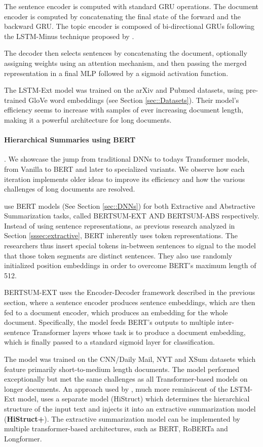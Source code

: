 \documentclass[preprint,review,12pt]{elsarticle}
\begin{document}
The sentence encoder is computed with standard GRU operations. The document encoder is computed by concatenating the final state of the forward and the backward GRU. The topic encoder is composed of bi-directional GRUs following the LSTM-Minus technique proposed by \citet{wang}.

The decoder then selects sentences by concatenating the document, optionally assigning weights using an attention mechanism, and then passing the merged representation in a final MLP followed by a sigmoid activation function. 

The LSTM-Ext model was trained on the arXiv and Pubmed datasets, using pre-trained GloVe \cite{glove} word embeddings (see Section \ref{sec::Datasets}). Their model's efficiency seems to increase with samples of ever increasing document length, making it a powerful architecture for long documents. 


\paragraph{Hierarchical Summaries using BERT}. We showcase the jump from traditional DNNs to todays Transformer models, from Vanilla to BERT and later to specialized variants. We observe how each iteration implements older ideas to improve its efficiency and how the various challenges of long documents are resolved.\label{sssec: HierBERT}

\citet{lapata_bert} use BERT models\cite{toutanova} (See Section \ref{sec::DNNs}) for both Extractive and Abstractive Summarization tasks, called BERTSUM-EXT AND BERTSUM-ABS respectively. Instead of using sentence representations, as previous research analyzed in Section \ref{sssec:extractive}, BERT inherently uses token representations. The researchers thus insert special tokens in-between sentences to signal to the model that those token segments are distinct sentences. They also use randomly initialized position embeddings in order to overcome BERT's maximum length of 512.

BERTSUM-EXT uses the Encoder-Decoder framework described in the previous section, where a sentence encoder produces sentence embeddings, which are then fed to a document encoder, which produces an embedding for the whole document. Specifically, the model feeds BERT's outputs to multiple inter-sentence Transformer layers whose task is to produce a document embedding, which is finally passed to a standard sigmoid layer for classification.

The model was trained on the CNN/Daily Mail, NYT \cite{nyt_dataset} and XSum \cite{nallapati2} datasets which feature primarily short-to-medium length documents. The model performed exceptionally but met the same challenges as all Transformer-based models on longer documents. An approach used by \citet{histruct}, much more reminiscent of the LSTM-Ext model, uses a separate model (HiStruct) which determines the hierarchical structure of the input text and injects it into an extractive summarization model (\textbf{HiStruct+}). The extractive summarization model can be implemented by multiple transformer-based architectures, such as BERT, RoBERTa and Longformer.
\end{document}
